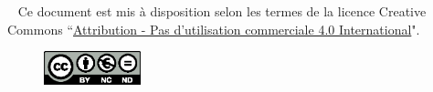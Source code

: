 \mbox{~}
\vfill
Ce document est mis à disposition selon les termes de la licence Creative
Commons ``\href{https://creativecommons.org/licenses/by-nc-nd/4.0/}{Attribution -
Pas d'utilisation commerciale 4.0 International}".

\begin{figure}[!h]
  \centering
  \includegraphics[width=0.25\textwidth]
  {textures/images/license/license.eps}
\end{figure}

\thispagestyle{empty}
